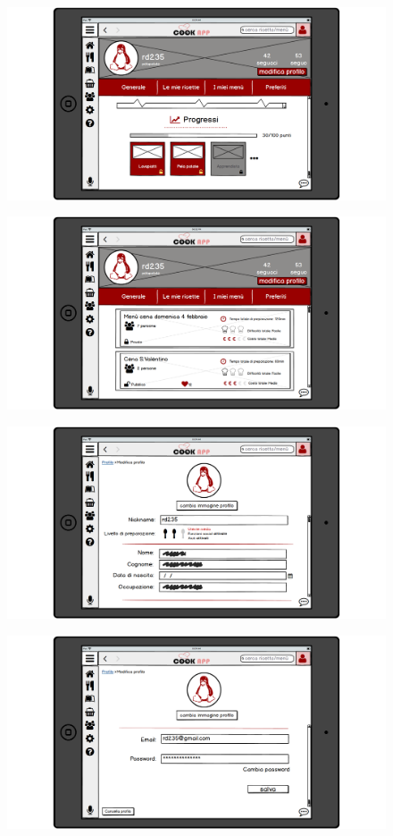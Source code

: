 \begin{itemize}
\begin{figure}[H]
\end{figure}
\begin{figure}[H]
	\centering
	\includegraphics[width=0.95\linewidth]{img/mockup/Profilo-generale2.png}
\end{figure}
\begin{figure}[H]
	\centering
	\includegraphics[width=0.95\linewidth]{img/mockup/Profilo-menu.png}
\end{figure}
\begin{figure}[H]
	\centering
	\includegraphics[width=0.95\linewidth]{img/mockup/Profilo-modifica.png}
\end{figure}
\begin{figure}[H]
	\centering
	\includegraphics[width=0.95\linewidth]{img/mockup/Profilo-modifica2.png}

\end{figure}
\end{itemize}
